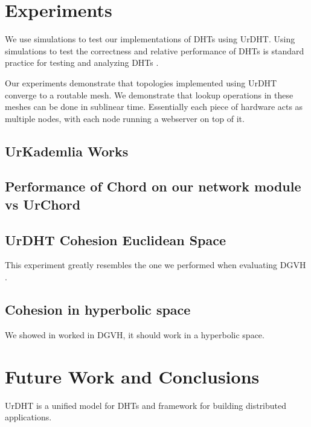 \documentclass[11pt,conference]{IEEEtran}
\begin{document}
\section{Experiments}
\label{sec:experiments}

We use simulations to test our implementations of DHTs using UrDHT.
Using simulations to test the correctness and relative performance of DHTs is standard practice for testing and analyzing DHTs \cite{kademlia} \cite{chord} \cite{tapestry} \cite{symphony} \cite{raynet} \cite{li2005comparing}.

Our experiments demonstrate that topologies implemented using UrDHT converge to a routable mesh.
We demonstrate that lookup operations in these meshes can be done in sublinear time.
Essentially each piece of hardware acts as multiple nodes, with each node running a webserver on top of it.



\subsection{UrKademlia Works}

\subsection{Performance of Chord on our network module vs UrChord}

\subsection{UrDHT Cohesion Euclidean Space}
This experiment greatly resembles the one we performed when evaluating DGVH \cite{dgvh}.

\subsection{Cohesion in hyperbolic space}
We showed in worked in DGVH, it should work in a hyperbolic space.






\section{Future Work and Conclusions}
\label{sec:future}

UrDHT is a unified model for DHTs and framework for building distributed applications.
\end{document}
